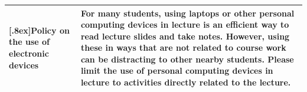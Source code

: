 \documentclass[10pt]{article}
\begin{document}
\begin{center}
\begin{tabular}{|p{} p{}|}
[.8ex]\textbf{Policy on the use of electronic devices} & 
For many students, using laptops or other personal computing devices in lecture is an
efficient way to read lecture slides and take notes. However, using these in ways that
are not related to course work can be distracting to other nearby students.
Please limit the use of personal computing devices in lecture to activities
directly related to the lecture. \\
\hline
\end{tabular}
\end{center}



\newpage
\end{document}
